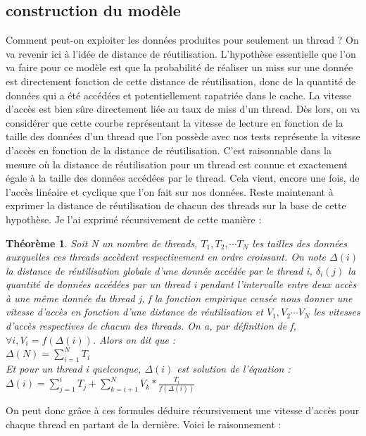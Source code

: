 \documentclass{report}
\begin{document}
\subsection{construction du modèle}
Comment peut-on exploiter les données produites pour seulement un thread ? On va revenir
ici à l'idée de distance de réutilisation. L'hypothèse essentielle que l'on va faire 
pour ce modèle est que la probabilité de réaliser un miss sur une donnée est directement
fonction de cette distance de réutilisation, donc de la quantité de données qui a été
accédées et potentiellement rapatriée dans le cache. La vitesse d'accès est bien sûre
directement liée au taux de miss d'un thread. Dès lors, on va considérer que cette 
courbe représentant la vitesse de lecture en fonction de la taille des données d'un thread 
que l'on possède avec nos tests représente la vitesse d'accès en fonction de la distance
de réutilisation. C'est raisonnable dans la mesure où la distance de réutilisation
pour un thread est connue et exactement égale à la taille des données accédées par le
thread. Cela vient, encore une fois, de l'accès linéaire et cyclique que l'on fait sur
nos données. Reste maintenant à exprimer la distance de réutilisation de chacun des threads sur la 
base de cette hypothèse. Je l'ai exprimé récursivement de cette manière : 
\newtheorem{th3}{Théorème}
\begin{th3}
Soit N un nombre de threads, $T_1, T_2, \cdots T_N$ les tailles des données auxquelles ces threads
accèdent respectivement en ordre croissant. On note $\Delta(i)$ la distance de réutilisation globale 
d'une donnée accédée par le thread i, $\delta_i(j)$ la quantité de données accédées par un thread i
pendant l'intervalle entre deux accès à une même donnée du thread j, f la fonction empirique censée 
nous donner une vitesse d'accès en fonction d'une distance de réutilisation et $V_1, V_2 \cdots V_N$ 
les vitesses d'accès respectives de chacun des threads. On a, par définition de f, $\forall 
i, V_i = f(\Delta(i))$. Alors on dit que :
\\$\Delta(N)= \sum_{i=1}^{N}{T_{i}}$
\\Et pour un thread i quelconque, $\Delta(i)$ est solution de l'équation : 
\\$\Delta(i)= \sum_{j=1}^{i}{T_{j}} + \sum_{k=i+1}^{N}{V_k} * \frac{T_i} {f(\Delta(i))}$
\end{th3}
On peut donc grâce à ces formules déduire récursivement une vitesse d'accès pour chaque thread en
partant de la dernière. Voici le raisonnement :
\end{document}
